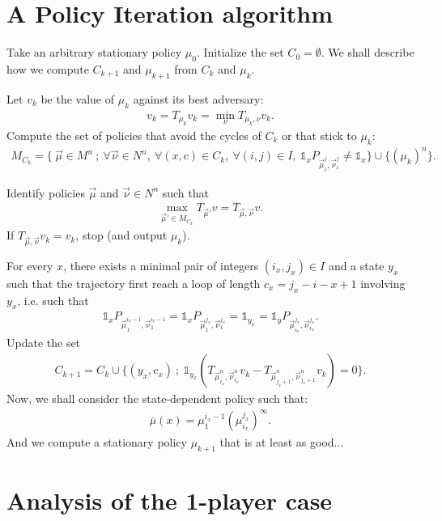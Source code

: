 \documentclass{article}
\def\1{{\mathds 1}}
\begin{document}
\section{A Policy Iteration algorithm}

Take an arbitrary stationary policy $\mu_0$. Initialize the set $C_0=\emptyset$. We shall describe how we compute $C_{k+1}$ and $\mu_{k+1}$ from $C_k$ and $\mu_k$.

Let $v_k$ be the value of $\mu_k$ against its best adversary:
\begin{align}
v_k = T_{\mu_k} v_k = \min_{\nu} T_{\mu_k,\nu} v_k.
\end{align}
Compute the set of policies that avoid the cycles of $C_k$ or that stick to $\mu_k$:
\begin{align}
  M_{C_k} = \{~ \vec\mu \in M^n ~;~ \forall \vec\nu \in N^n,~ \forall (x,c) \in C_k,~ \forall (i,j) \in I,~ \1_x P_{\vec\mu_i^j,\vec\nu_i^j} \neq \1_x \} \cup \{ (\mu_k)^n \}.  
\end{align}

Identify policies $\vec\mu$ and $\vec\nu \in N^n$ such that
\begin{align}
  \max_{\vec\mu' \in M_{C_k}} T_{\vec\mu'} v = T_{\vec\mu,\vec\nu}v.
\end{align}
If $T_{\vec\mu,\vec\nu} v_k = v_k$, stop (and output $\mu_k$).

For every $x$, there exists a minimal pair of integers $(i_x,j_x) \in I$ and a state $y_x$ such that the trajectory first reach a loop of length $c_x=j_x-i-x+1$ involving $y_x$, i.e. such that
\begin{align}
  \1_x P_{\vec\mu_1^{i_x-1},\vec\nu_1^{i_x-1}} = \1_x P_{\vec\mu_1^{j_x},\vec\nu_1^{j_x}} = \1_{y_x} = \1_y P_{\vec\mu_{i_x}^{j_x},\vec\nu_{i_x}^{j_x}}.
\end{align}
Update the set
\begin{align}
  C_{k+1} = C_k \cup \{ (y_x,c_x) ~;~ \1_{y_x} (T_{\vec\mu_{i_x}^{n},\vec\nu_{i_x}^{n}}v_k - T_{\vec\mu_{j_x+1}^{n},\vec\nu_{j_x+1}^{n}}v_k) = 0 \}.
\end{align}
Now, we shall consider the state-dependent policy such that:
\begin{align}
  \bar{\mu}(x) = \mu_1^{i_x-1} (\mu_{i_x}^{j_x})^\infty.
\end{align}
And we compute a stationary policy $\mu_{k+1}$ that is at least as good...

  



\section{Analysis of the 1-player case}
\end{document}
